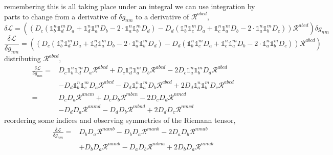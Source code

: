 \documentclass[aps,prd,preprint]{revtex4-1}
\begin{document}
\begin{fleqn}
remembering this is all taking place under an integral we can use integration by parts to change from a derivative of $\delta g_{nm}$ to a derivative of $\mathcal{R}^{abcd}$,
\begin{equation*}
    \delta \mathcal{L} = \left( \left( D_c (\mathds{1}^n_b \mathds{1}^m_d D_a + \mathds{1}^n_d \mathds{1}^m_a D_b - 2 \cdot \mathds{1}^n_a \mathds{1}^m_b D_d) - D_d (\mathds{1}^n_b \mathds{1}^m_c D_a + \mathds{1}^n_c \mathds{1}^m_a D_b - 2 \cdot \mathds{1}^n_a \mathds{1}^m_b D_c) \right) \mathcal{R}^{abcd} \right) \delta g_{nm}
\end{equation*}
\begin{equation*}
    \frac{\delta \mathcal{L}}{\delta g_{nm}} = \left( \left( D_c (\mathds{1}^n_b \mathds{1}^m_d D_a + \mathds{1}^n_d \mathds{1}^m_a D_b - 2 \cdot \mathds{1}^n_a \mathds{1}^m_b D_d) - D_d (\mathds{1}^n_b \mathds{1}^m_c D_a + \mathds{1}^n_c \mathds{1}^m_a D_b - 2 \cdot \mathds{1}^n_a \mathds{1}^m_b D_c) \right) \mathcal{R}^{abcd} \right)
\end{equation*}
distributing $\mathcal{R}^{abcd}$,
\begin{equation*}
\begin{aligned}
    \frac{\delta \mathcal{L}}{\delta g_{nm}} = &D_c \mathds{1}^n_b \mathds{1}^m_d D_a \mathcal{R}^{abcd} + D_c \mathds{1}^n_d \mathds{1}^m_a D_b \mathcal{R}^{abcd} - 2 D_c \mathds{1}^n_a \mathds{1}^m_b D_d \mathcal{R}^{abcd} \\
    &- D_d \mathds{1}^n_b \mathds{1}^m_c D_a \mathcal{R}^{abcd} - D_d \mathds{1}^n_c \mathds{1}^m_a D_b \mathcal{R}^{abcd} + 2 D_d \mathds{1}^n_a \mathds{1}^m_b D_c \mathcal{R}^{abcd} \\
    = &D_c D_a \mathcal{R}^{ancm} + D_c D_b \mathcal{R}^{mbcn} - 2 D_c D_d \mathcal{R}^{nmcd} \\
    &- D_d D_a \mathcal{R}^{anmd} - D_d D_b \mathcal{R}^{mbnd} + 2 D_d D_c \mathcal{R}^{nmcd}
\end{aligned}
\end{equation*}
reordering some indices and observing symmetries of the Riemann tensor,
\begin{equation*}
\begin{aligned}
    \frac{\delta \mathcal{L}}{\delta g_{nm}} = &D_b D_a \mathcal{R}^{namb} - D_b D_a \mathcal{R}^{manb} - 2 D_a D_b \mathcal{R}^{nmab} \\
    &+ D_b D_a \mathcal{R}^{namb} - D_a D_b \mathcal{R}^{mbna} + 2 D_b D_a \mathcal{R}^{nmab}
\end{aligned}
\end{equation*}

\end{fleqn}
\end{document}
